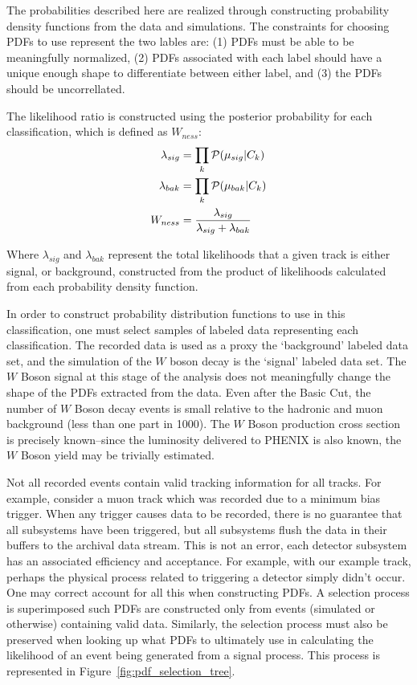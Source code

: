 The probabilities described here are realized through constructing probability
density functions from the data and simulations. The constraints for choosing
PDFs to use represent the two lables are: (1) PDFs must be able to be
meaningfully normalized, (2) PDFs associated with each label should have a
unique enough shape to differentiate between either label, and (3) the PDFs
should be uncorrellated.
 

The likelihood ratio is constructed using the posterior probability
for each classification, which is defined as $W_{ness}$:
\begin{align}
  \lambda_{sig} &= \prod_{k}\mathcal{P}(\mu_{sig}\vert C_k)\\
  \lambda_{bak} &= \prod_{k}\mathcal{P}(\mu_{bak}\vert C_k)\\
  W_{ness} &= { 
    {\lambda_{sig}}
    \over 
    {\lambda_{sig}+\lambda_{bak}}\label{eq:wness_calculation}
  }
\end{align}

{\noindent}Where $\lambda_{sig}$ and $\lambda_{bak}$ represent the total
likelihoods that a given track is either signal, or background, constructed from
the product of likelihoods calculated from each probability density function.

In order to construct probability distribution functions to use in this
classification, one must select samples of labeled data representing each
classification. The recorded data is used as a proxy the `background' labeled
data set, and the simulation of the $W$ boson decay is the `signal' labeled data
set. The $W$ Boson signal at this stage of the analysis does not meaningfully
change the shape of the PDFs extracted from the data. Even after the Basic Cut,
the number of $W$ Boson decay events is small relative to the hadronic and muon
background (less than one part in 1000). The $W$ Boson production cross section
is precisely known--since the luminosity delivered to PHENIX is also known, the
$W$ Boson yield may be trivially estimated.

Not all recorded events contain valid tracking information for all tracks. For
example, consider a muon track which was recorded due to a minimum bias trigger.
When any trigger causes data to be recorded, there is no guarantee that all
subsystems have been triggered, but all subsystems flush the data in their
buffers to the archival data stream. This is not an error, each detector
subsystem has an associated efficiency and acceptance.  For example, with our
example track, perhaps the physical process related to triggering a detector
simply didn't occur. One may correct account for all this when constructing
PDFs.  A selection process is superimposed such PDFs are constructed only from
events (simulated or otherwise) containing valid data. Similarly, the selection
process must also be preserved when looking up what PDFs to ultimately use in
calculating the likelihood of an event being generated from a signal process.
This process is represented in Figure~\ref{fig:pdf_selection_tree}.

